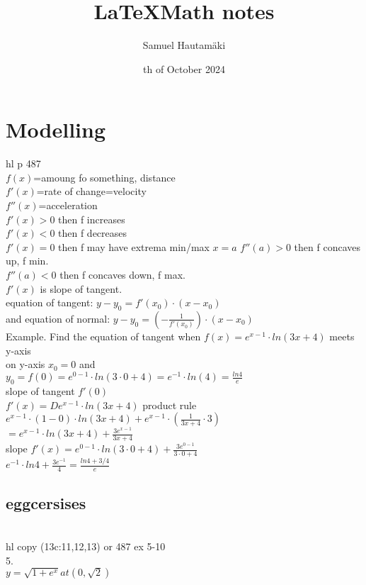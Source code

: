 \documentclass{article}
\title{\LaTeX Math notes}
\author{Samuel Hautamäki}
\date{th of October 2024}
\begin{document}
  \maketitle
   
  \section{Modelling}
  hl p 487\\
  $f(x)$=amoung fo something, distance\\
  $f'(x)$=rate of change=velocity\\
  $f''(x)$=acceleration\\
  $f'(x)>0$ then f increases\\
  $f'(x)<0$ then f decreases\\
  $f'(x)=0$ then f may have extrema min/max
    $x=a$
      $f''(a)>0$ then f concaves up, f min.\\
      $f''(a)<0$ then f concaves down, f max.\\
  $f'(x)$ is slope of tangent.\\
  equation of tangent: $y-y_0=f'(x_0)\cdot(x-x_0)$\\
  and equation of normal: $y-y_0=(-\frac{1}{f'(x_0)})\cdot(x-x_0)$\\
  Example. Find the equation of tangent when $f(x)=e^{x-1}\cdot ln(3x+4)$ meets y-axis\\
  on y-axis $x_0=0$ and\\
  $y_0=f(0)=e^{0-1}\cdot ln(3\cdot0+4)=e^{-1}\cdot ln(4)=\frac{ln 4}{e}$\\
  slope of tangent $f'(0)$\\
  $f'(x)=D e^{x-1}\cdot ln(3x+4)$ product rule\\
  $e^{x-1}\cdot(1-0)\cdot ln(3x+4)+e^{x-1}\cdot (\frac{1}{3x+4}\cdot3)$\\
  $=e^{x-1}\cdot ln(3x+4)+\frac{3e^{x-1}}{3x+4}$\\
  slope $f'(x)=e^{0-1}\cdot ln(3\cdot0+4)+\frac{3e^{0-1}}{3\cdot0+4}$\\
  $e^{-1}\cdot ln4+\frac{3e^{-1}}{4}=\frac{ln4+3/4}{e}$\\
  \subsection{eggcersises}\\
  hl copy (13c:11,12,13) or 487 ex 5-10\\
  5. \\
  $y=\sqrt{1+e^x} at (0,\sqrt{2})$\\
  

   
\end{document}
